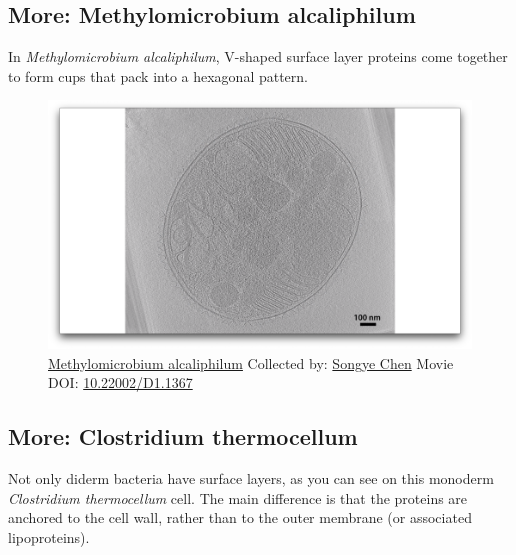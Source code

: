 \documentclass[]{tufte-book}
\begin{document}
\hypertarget{Methylomicrobium_alcaliphilum}{\subsection*{More:
Methylomicrobium alcaliphilum}\label{Methylomicrobium_alcaliphilum}}

In \emph{Methylomicrobium alcaliphilum}, V-shaped surface layer proteins
come together to form cups that pack into a hexagonal pattern.





\begin{figure}
\includegraphics{movie_stills/2_7a} \caption[\protect\hyperlink{tree}{Methylomicrobium alcaliphilum}
Collected by: \protect\hyperlink{songye_chen}{Songye Chen} Movie DOI:
\href{https://doi.org/10.22002/D1.1367}{10.22002/D1.1367}]{\protect\hyperlink{tree}{Methylomicrobium alcaliphilum}
Collected by: \protect\hyperlink{songye_chen}{Songye Chen} Movie DOI:
\href{https://doi.org/10.22002/D1.1367}{10.22002/D1.1367}}\label{fig:2-7a}
\end{figure}

\hypertarget{Clostridium_thermocellum}{\subsection*{More: Clostridium
thermocellum}\label{Clostridium_thermocellum}}

Not only diderm bacteria have surface layers, as you can see on this
monoderm \emph{Clostridium thermocellum} cell. The main difference is
that the proteins are anchored to the cell wall, rather than to the
outer membrane (or associated lipoproteins).
\end{document}
